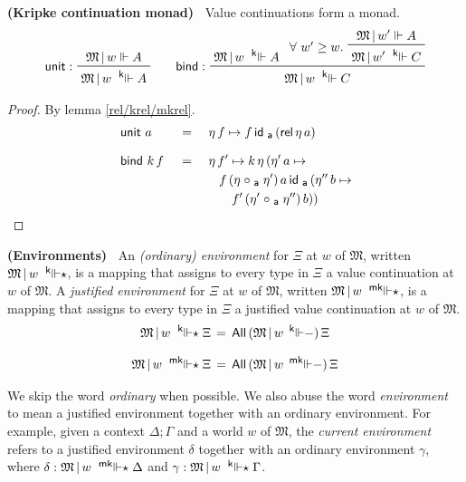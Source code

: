 \documentclass{entcs}
\numberwithin{equation}{thm}
\newcommand{\preop}[1]{\mathord{#1}-}
\newcommand{\tsf}[1]{\textsf{\upshape{#1}}}
\newcommand{\stsf}[1]{\tsf{\small{#1}}}
\renewcommand{\:}{\mathrel{:}}
\newcommand{\tyrule}[1]{\prftree[l]{${#1} \:\,$}}
\let\oldforall\forall
\renewcommand{\forall}{\oldforall\,}
\newcommand{\0}{\varnothing}
\newcommand{\All}{\operatorname{\tsf{All}}}
\newcommand{\M}{\mathfrak{M}}
\newcommand{\ida}{\operatorname{\tsf{id}_{\stsf{a}}}}
\newcommand{\compa}{\mathrel{\circ_{\stsf{a}}}}
\newcommand{\ee}{\mathrel{\Vdash}}
\newcommand{\kee}{\mathrel{^{\stsf{k}\mkern-6mu}\Vdash}}
\newcommand{\mkee}{\mathrel{^{\stsf{mk}\mkern-6mu}\Vdash}}
\newcommand{\kees}{\mathrel{^{\stsf{k}\mkern-6mu}\Vdash\mkern-5mu\star}}
\newcommand{\mkees}{\mathrel{^{\stsf{mk}\mkern-6mu}\Vdash\mkern-5mu\star}}
\newcommand{\rel}{\operatorname{\tsf{rel}}}
\newcommand{\unit}{\operatorname{\tsf{unit}}}
\newcommand{\bind}{\operatorname{\tsf{bind}}}
\begin{document}
\begin{lemma}
  \normalshape
  \textbf{(Kripke continuation monad)\ }
  \label{unit/bind}
  Value continuations form a monad.
  \begin{gather*}
    \tyrule{\unit}{\M\,|\,w \ee A}{\M\,|\,w \kee A}\qquad
    \tyrule{\bind}{\M\,|\,w \kee A}{\raisebox{8pt}{$\forall w' \ge w.\ $} \prftree{\M\,|\, w' \ee A}{\M\,|\, w' \kee C}}{\M\,|\,w \kee C}
  \end{gather*}
  \itshape
  \begin{proof}
    \normalshape
    By lemma \ref{rel/krel/mkrel}.
    \begin{alignat*}{3}
      & \unit\,a      \,&&=\, &&\,\eta\, f \mapsto f \ida\, (\rel \eta\, a)\\[0.5\baselineskip]
      & \bind\, k\, f \,&&=\, &&\,\eta\, f' \mapsto k\, \eta\, (\eta'\, a \mapsto\\
      &                 &&    &&\quad f\, (\eta \compa \eta')\, a \ida\, (\eta''\, b \mapsto\\
      &                 &&    &&\quad\quad f'\, (\eta' \compa \eta'')\, b))
    \end{alignat*}
  \end{proof}
\end{lemma}

\begin{definition}
  \textbf{(Environments)\ }
  \label{kees/mkees}
  An \emph{(ordinary) environment} for $\Xi$ at $w$ of $\M$, written $\M\,|\,w \kees$, is a mapping that assigns to every type in $\Xi$ a value continuation at $w$ of $\M$.
  A \emph{justified environment} for $\Xi$ at $w$ of $\M$, written $\M\,|\,w \mkees$, is a mapping that assigns to every type in $\Xi$ a justified value continuation at $w$ of $\M$.
  \begin{gather*}
    \M\,|\,w \kees \Xi  \,=\, \All\, (\M\,|\,w\, \preop{\kee})\, \Xi\\[0.5\baselineskip]
    \M\,|\,w \mkees \Xi \,=\, \All\, (\M\,|\,w\, \preop{\mkee})\, \Xi
  \end{gather*}
\end{definition}

\noindent
We skip the word \emph{ordinary} when possible.  We also abuse the word \emph{environment} to mean a justified environment together with an ordinary environment.  For example, given a context $\Delta; \Gamma$ and a world $w$ of $\M$, the \emph{current environment} refers to a justified environment $\delta$ together with an ordinary environment $\gamma$, where $\delta : \M\,|\,w \mkees \Delta$ and $\gamma : \M\,|\,w \kees \Gamma$.
\end{document}
